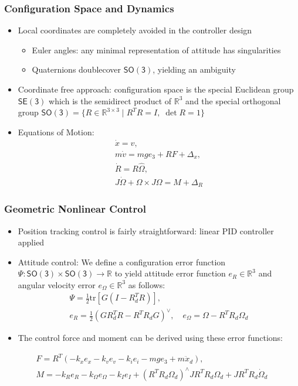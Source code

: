 \documentclass[11pt,professionalfonts,hyperref={pdftex,pdfpagemode=none,pdfstartview=FitH}]{beamer}
\newcommand{\SO}{\ensuremath{\mathsf{SO(3)}}}
\newcommand{\SE}{\ensuremath{\mathsf{SE(3)}}}
\renewcommand{\Re}{\ensuremath{\mathbb{R}}}
\begin{document}
\begin{frame}
\frametitle{Configuration Space and Dynamics}

\begin{itemize}
\item Local coordinates are completely avoided in the controller design
	\begin{itemize}
	\item Euler angles: any minimal representation of attitude has singularities
	\item Quaternions doublecover $\SO$, yielding an ambiguity
	\end{itemize}
\item Coordinate free approach: configuration space is the special Euclidean group $\SE$ which is the semidirect product of $\Re^3$ and the special orthogonal group ${\SO}=\{R \in{\Re}^{3\times3}\mid R^T R=I,\; \det{R}=1\}$ 
\item Equations of Motion:
\begin{gather*}
\dot x=v,\label{eqn:xdot}\\
m\dot v=mge_3+RF+\Delta_x, \label{eqn:vdot}\\
\dot R=R\hat \Omega,\\
J\dot\Omega + \Omega\times J\Omega =M+\Delta_R\label{eqn:Wdot}
\end{gather*}

\end{itemize}
\end{frame}

\begin{frame}
\frametitle{Geometric Nonlinear Control}

\begin{itemize}
\item Position tracking control is fairly straightforward: linear PID controller applied
\item Attitude control: We define a configuration error function $\Psi:\SO\times\SO\rightarrow\Re$ to yield attitude error function $e_R\in{\Re}^3$ and angular velocity error $e_\Omega\in{\Re}^3$ as follows:
\begin{gather*}
\Psi = \frac{1}{2}{\mathrm{tr}}[G(I-R_d^TR)],\label{eqn:Psi}\\
e_R =\frac{1}{2} (GR_d^TR-R^TR_dG)^\vee,\nonumber
\quad e_\Omega = \Omega - R^T R_d\Omega_d\label{eqn:eW}
\end{gather*}
\item The control force and moment can be derived using these error functions:
\end{itemize}
\begin{gather*}
F = R^T(-k_x e_x-k_v e_v -k_i e_i-mge_3+m\ddot x_d),\label{eqn:F}\\
M = -k_R e_R -k_\Omega e_\Omega -k_I e_I+(R^TR_d\Omega_d)^\wedge J R^T R_d \Omega_d + J R^T R_d\dot\Omega_d\label{eqn:M}
\end{gather*}
\end{frame}
\end{document}
